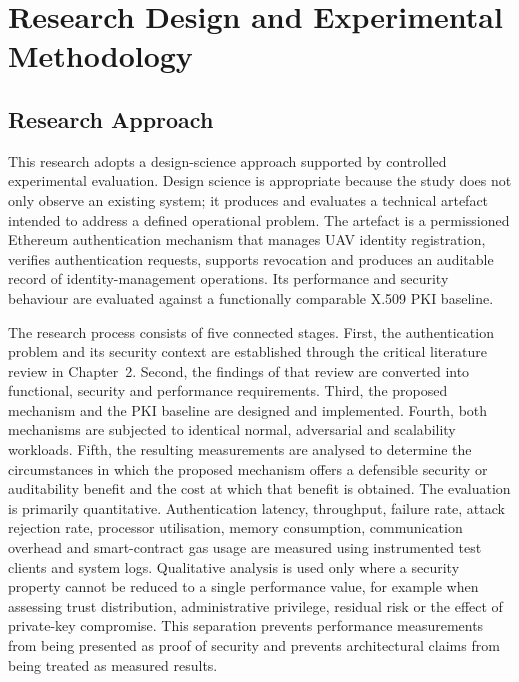\chapter{Research Design and Experimental Methodology}
\label{chap:research-design-methodology}

\section{Research Approach}
\label{sec:ch3-research-approach}
This research adopts a design-science approach supported by controlled experimental evaluation\cite{Hevner2004DesignScience,Peffers2007DSRM}. Design science is appropriate because the study does not only observe an existing system; it produces and evaluates a technical artefact intended to address a defined operational problem. The artefact is a permissioned Ethereum authentication mechanism that manages UAV identity registration, verifies authentication requests, supports revocation and produces an auditable record of identity-management operations. Its performance and security behaviour are evaluated against a functionally comparable X.509 PKI baseline.

The research process consists of five connected stages. First, the authentication problem and its security context are established through the critical literature review in Chapter~2. Second, the findings of that review are converted into functional, security and performance requirements. Third, the proposed mechanism and the PKI baseline are designed and implemented. Fourth, both mechanisms are subjected to identical normal, adversarial and scalability workloads. Fifth, the resulting measurements are analysed to determine the circumstances in which the proposed mechanism offers a defensible security or auditability benefit and the cost at which that benefit is obtained.
The evaluation is primarily quantitative. Authentication latency, throughput, failure rate, attack rejection rate, processor utilisation, memory consumption, communication overhead and smart-contract gas usage are measured using instrumented test clients and system logs. Qualitative analysis is used only where a security property cannot be reduced to a single performance value, for example when assessing trust distribution, administrative privilege, residual risk or the effect of private-key compromise. This separation prevents performance measurements from being presented as proof of security and prevents architectural claims from being treated as measured results.

